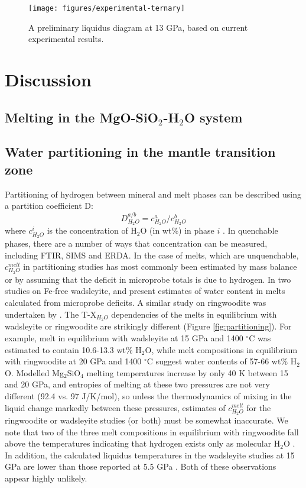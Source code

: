 \documentclass[review]{elsarticle}
\begin{document}
\begin{figure}[ht!]
  \centering
      \texttt{[image: figures/experimental-ternary]}
  \caption{A preliminary liquidus diagram at 13 GPa, based on current experimental results.}
  \label{fig:liquidus}
\end{figure}


\section{Discussion}
\subsection{Melting in the MgO-SiO$_2$-H$_2$O system}
\subsection{Water partitioning in the mantle transition zone}

Partitioning of hydrogen between mineral and melt phases can be described using a partition coefficient D:
\begin{equation}
  D^{a/b}_{H_2O} = c^a_{H_2O} / c^b_{H_2O}
\end{equation}
where $c^i_{H_2O}$ is the concentration of H$_2$O (in wt\%) in phase $i$ \citep{KB2006}. In quenchable phases, there are a number of ways that concentration can be measured, including FTIR, SIMS and ERDA. In the case of melts, which are unquenchable, $c^{melt}_{H_2O}$ in partitioning studies has most commonly been estimated by mass balance or by assuming that the deficit in microprobe totals is due to hydrogen. In two studies on Fe-free wadsleyite, \cite{DDFK2005} and \cite{LSOK2011} present estimates of water content in melts calculated from microprobe deficits. A similar study on ringwoodite was undertaken by \cite{OMY2000}. The T-X$_{H_2O}$ dependencies of the melts in equilibrium with wadsleyite or ringwoodite are strikingly different (Figure \ref{fig:partitioning}). For example, melt in equilibrium with wadsleyite at 15 GPa and 1400 $^{\circ}$C was estimated to contain 10.6-13.3 wt\% H$_2$O, while melt compositions in equilibrium with ringwoodite at 20 GPa and 1400 $^{\circ}$C suggest water contents of 57-66 wt\% H$_2$O. Modelled Mg$_2$SiO$_4$ melting temperatures increase by only 40 K between 15 and 20 GPa, and entropies of melting at these two pressures are not very different (92.4 vs. 97 J/K/mol), so unless the thermodynamics of mixing in the liquid change markedly between these pressures, estimates of $c^{melt}_{H_2O}$ for the ringwoodite or wadsleyite studies (or both) must be somewhat inaccurate. We note that two of the three melt compositions in equilibrium with ringwoodite fall above the temperatures indicating that hydrogen exists only as molecular H$_2$O \citep{SS1985}. In addition, the calculated liquidus temperatures in the wadsleyite studies at 15 GPa are lower than those reported at 5.5 GPa \citep{Inoue1994}. Both of these observations appear highly unlikely.
\end{document}
